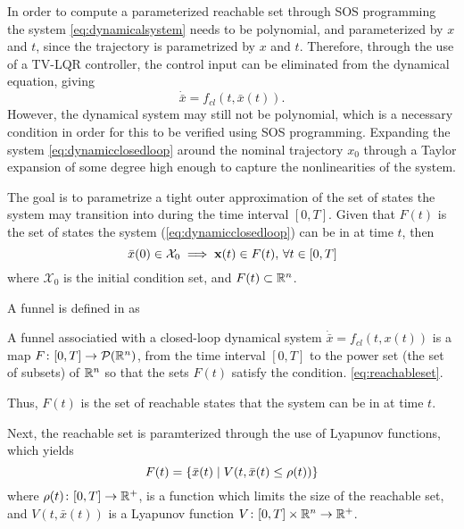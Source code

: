 In order to compute a parameterized reachable set through \ac{SOS} programming
the system \ref{eq:dynamicalsystem} needs to be polynomial, and parameterized by
\(x\) and \(t\), since the trajectory is parametrized by \(x\) and \(t\).
Therefore, through the use of a \ac{TV-LQR} controller, the control input can be
eliminated from the dynamical equation, giving
\begin{equation}
  \label{eq:dynamicclosedloop}
  \dot{\bar{x}} = f_{cl}(t,\bar{x}(t)).
\end{equation}
However, the dynamical system may still not be polynomial, which is a necessary
condition in order for this to be verified using \ac{SOS} programming. Expanding
the system \ref{eq:dynamicclosedloop} around the nominal trajectory \(x_0\)
through a Taylor expansion of some degree high enough to capture the
nonlinearities of the system.

The goal is to parametrize a tight outer approximation of the set of states the
system may transition into during the time interval \([0,T]\). Given that
\(F(t)\) is the set of states the system (\ref{eq:dynamicclosedloop}) can be in
at time \(t\), then
\begin{equation}
  \label{eq:reachableset}
  \bar{x}(0) \in \mathcal{X}_0 \implies \mathbf{x}(t) \in F(t), \, \forall t \in [0,T]
\end{equation} \cite{majumdarFunnelLibrariesRealtime2017} 
where \(\mathcal{X}_0\) is the initial condition set, and \(F(t) \subset \mathbb{R}^n\).

A funnel is defined in \cite{majumdarFunnelLibrariesRealtime2017} as
\begin{definition}
  \label{def:funnel}
  A funnel associatied with a closed-loop dynamical system \(\dot{\bar{x}} =
  f_{cl}(t,x(t))\) is a map \(F \colon [0,T] \rightarrow \mathcal{P}(\mathbb{R}^n)\),
  from the time interval \([0,T]\) to the power set (\ie the set of subsets) of
  \(\mathbb{R}^n\) so that the sets \(F(t)\) satisfy the condition.
  \ref{eq:reachableset}.
\end{definition}
Thus, \(F(t)\) is the set of reachable states that the system can be in at time
\(t\).

Next, the reachable set is paramterized through the use of Lyapunov functions,
which yields
\begin{equation}
  F(t) = \lbrace\bar{x}(t) \mid V(t, \bar{x}(t) \leq \rho (t))\rbrace
\end{equation}
where \(\rho (t) \colon [0,T] \rightarrow \mathbb{R}^+\), is a function which limits the
size of the reachable set, and \(V(t,\bar{x}(t))\) is a Lyapunov function \(V
\colon [0,T] \times \mathbb{R}^n \rightarrow \mathbb{R}^+\).

